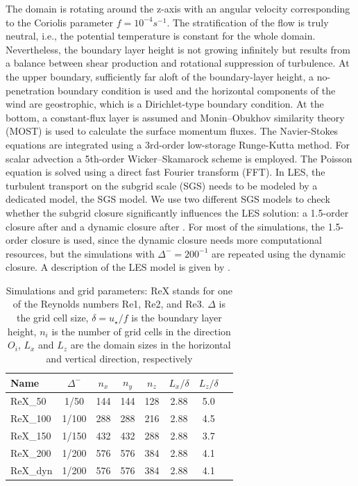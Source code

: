 \documentclass[a4paper,11pt]{article}
\begin{document}
The domain is rotating around the z-axis with an angular velocity corresponding to the Coriolis parameter $f=10^{-4}s^{-1}$. The stratification of the flow is truly neutral, i.e., the potential temperature is constant for the whole domain. Nevertheless, the boundary layer height is not growing infinitely but results from a balance between shear production and rotational suppression of turbulence. At the upper boundary, sufficiently far aloft of the boundary-layer height, a no-penetration boundary condition is used and the horizontal components of the wind are geostrophic, which is a Dirichlet-type boundary condition. At the bottom, a constant-flux layer is assumed and Monin--Obukhov similarity theory (MOST) is used to calculate the surface momentum fluxes. The Navier-Stokes equations are integrated using a 3rd-order low-storage Runge-Kutta method. For scalar advection a 5th-order Wicker--Skamarock scheme is employed. The Poisson equation is solved using a direct fast Fourier transform (FFT). In LES, the turbulent transport on the subgrid scale (SGS) needs to be modeled by a dedicated model, the SGS model. We use two different SGS models to check whether the subgrid closure significantly influences the LES solution: a 1.5-order closure after \cite{deardorff1980stratocumulus} and a dynamic closure after \cite{heinz2008realizability}. For most of the simulations, the 1.5-order closure is used, since the dynamic closure needs more computational resources, but the simulations with $\Delta^-=200^{-1}$ are repeated using the dynamic closure.  A description of the LES model is given by \cite{maronga2020overview}.

\begin{table}
	\centering
	\caption{Simulations and grid parameters: ReX stands for one of the Reynolds numbers Re1, Re2, and Re3. $\Delta$ is the grid cell size, $\delta=u_\star/f$ is the boundary layer height, $n_i$ is the number of grid cells in the direction $O_i$, $L_x$ and $L_z$ are the domain sizes in the horizontal and vertical direction, respectively}
	  \begin{tabular}{lccccccc}
          \toprule 
	    Name & $\Delta^-$ & $n_x$ & $n_y$ & $n_z$ & $L_x/\delta$ & $L_z/\delta$  \\ 
          \midrule
  	  ReX\_50 & 1/50 & 144 & 144 & 128 & 2.88 & 5.0 \\
  	  ReX\_100 & 1/100 & 288 & 288 & 216 & 2.88 & 4.5 \\
	    ReX\_150 & 1/150 & 432 & 432 & 288 & 2.88 & 3.7 \\
  	  ReX\_200 & 1/200 & 576 & 576 & 384 & 2.88 & 4.1 \\
  	  ReX\_dyn & 1/200 & 576 & 576 & 384 & 2.88 & 4.1 \\
           \bottomrule
		\end{tabular}
	\label{simulation_parameters2}
\end{table}
\end{document}
